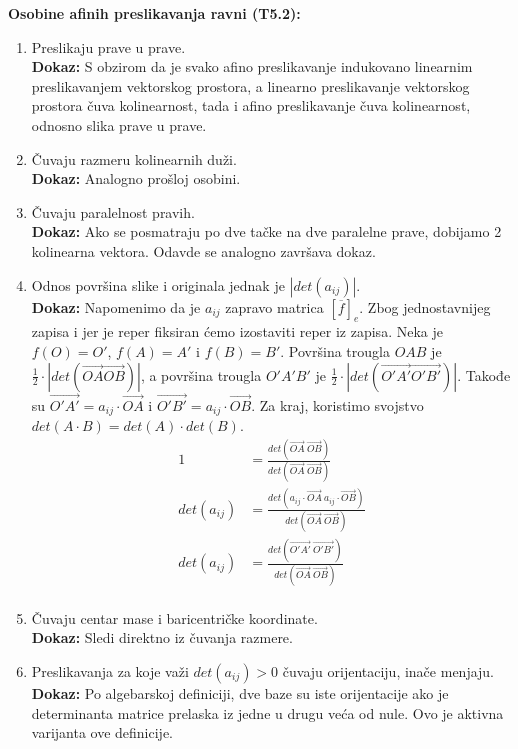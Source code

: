 \documentclass[12pt]{article}
\newcommand{\vek}[1]{\overrightarrow{#1}}
\begin{document}
\textbf{Osobine afinih preslikavanja ravni (T5.2):}
\begin{enumerate}[label=\textbf{(\arabic*)}]
    \item Preslikaju prave u prave.\\
          \textbf{Dokaz:} S obzirom da je svako afino preslikavanje indukovano linearnim preslikavanjem
          vektorskog prostora, a linearno preslikavanje vektorskog prostora
          čuva kolinearnost, tada i afino preslikavanje čuva kolinearnost, odnosno slika prave u prave.

    \item Čuvaju razmeru kolinearnih duži.\\
          \textbf{Dokaz:} Analogno prošloj osobini.

    \item Čuvaju paralelnost pravih.\\
          \textbf{Dokaz:} Ako se posmatraju po dve tačke na dve paralelne prave,
          dobijamo 2 kolinearna vektora. Odavde se analogno završava dokaz.

    \item Odnos površina slike i originala jednak je $|det(a_{ij})|$.\\
          \textbf{Dokaz:} Napomenimo da je $a_{ij}$ zapravo matrica $[\overline{f}]_e$.
          Zbog jednostavnijeg zapisa i jer je reper fiksiran ćemo izostaviti reper iz zapisa.
          Neka je $f(O)=O'$, $f(A)=A'$ i $f(B)=B'$. Površina trougla
          $OAB$ je $\frac{1}{2}\cdot |det(\vek{OA}\vek{OB})|$,
          a površina trougla $O'A'B'$ je $\frac{1}{2}\cdot |det(\vek{O'A'}\vek{O'B'})|$.
          Takođe su $\vek{O'A'}=a_{ij}\cdot \vek{OA}$ i $\vek{O'B'}=a_{ij}\cdot \vek{OB}$.
          Za kraj, koristimo svojstvo $det(A\cdot B)=det(A)\cdot det(B)$.
          \begin{align*}
              1           & =\frac{det(\vek{OA}\ \vek{OB})}{det(\vek{OA}\ \vek{OB})}                       \\
              det(a_{ij}) & =\frac{det(a_{ij}\cdot\vek{OA}\ a_{ij}\cdot\vek{OB})}{det(\vek{OA}\ \vek{OB})} \\
              det(a_{ij}) & =\frac{det(\vek{O'A'}\ \vek{O'B'})}{det(\vek{OA}\ \vek{OB})}                   \\
          \end{align*}

    \item Čuvaju centar mase i baricentričke koordinate.\\
          \textbf{Dokaz:} Sledi direktno iz čuvanja razmere.

    \item Preslikavanja za koje važi $det(a_{ij})>0$ čuvaju orijentaciju,
          inače menjaju.\\
          \textbf{Dokaz:} Po algebarskoj definiciji, dve baze su iste
          orijentacije ako je determinanta matrice prelaska iz jedne u drugu
          veća od nule. Ovo je aktivna varijanta ove definicije.
\end{enumerate}
\par
\end{document}
